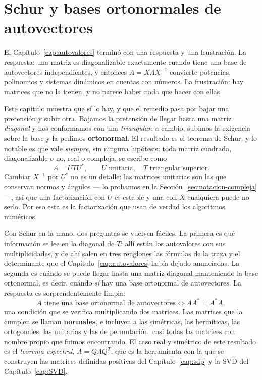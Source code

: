 
\chapter{Schur y bases ortonormales de autovectores}\label{cap:schur}

El Capítulo~\ref{cap:autovalores} terminó con una respuesta y una frustración. La
respuesta: una matriz es diagonalizable exactamente cuando tiene una base de autovectores
independientes, y entonces $A=X\Lambda X^{-1}$ convierte potencias, polinomios y sistemas
dinámicos en cuentas con números. La frustración: hay matrices que no la tienen, y no
parece haber nada que hacer con ellas.

Este capítulo muestra que sí lo hay, y que el remedio pasa por bajar una pretensión y
subir otra. Bajamos la pretensión de llegar hasta una matriz \emph{diagonal} y nos
conformamos con una \emph{triangular}; a cambio, subimos la exigencia sobre la base y la
pedimos \textbf{ortonormal}. El resultado es el teorema de Schur, y lo notable es que
vale \emph{siempre}, sin ninguna hipótesis: toda matriz cuadrada, diagonalizable o no,
real o compleja, se escribe como
\[
A=UTU^{*},\qquad U \text{ unitaria},\quad T \text{ triangular superior}.
\]
Cambiar $X^{-1}$ por $U^{*}$ no es un detalle: las matrices unitarias son las que
conservan normas y ángulos --- lo probamos en la Sección~\ref{sec:notacion-compleja}
---, así que una factorización con $U$ es estable y una con $X$ cualquiera puede no
serlo. Por eso esta es la factorización que usan de verdad los algoritmos numéricos.

Con Schur en la mano, dos preguntas se vuelven fáciles. La primera es qué información se
lee en la diagonal de $T$: allí están los autovalores con sus multiplicidades, y de ahí
salen en tres renglones las fórmulas de la traza y el determinante que el
Capítulo~\ref{cap:autovalores} había dejado anunciadas. La segunda es cuándo se puede
llegar hasta una matriz diagonal manteniendo la base ortonormal, es decir, cuándo
\emph{sí} hay una base ortonormal de autovectores. La respuesta es sorprendentemente
limpia:
\[
A \text{ tiene una base ortonormal de autovectores}
\iff
AA^{*}=A^{*}A ,
\]
una condición que se verifica multiplicando dos matrices. Las matrices que la cumplen se
llaman \textbf{normales}, e incluyen a las simétricas, las hermíticas, las ortogonales,
las unitarias y las de permutación: casi todas las matrices con nombre propio que fuimos
encontrando. El caso real y simétrico de este resultado es el \emph{teorema espectral},
$A=Q\Lambda Q^{T}$, que es la herramienta con la que se construyen las matrices definidas
positivas del Capítulo~\ref{cap:sdp} y la SVD del Capítulo~\ref{cap:SVD}.

